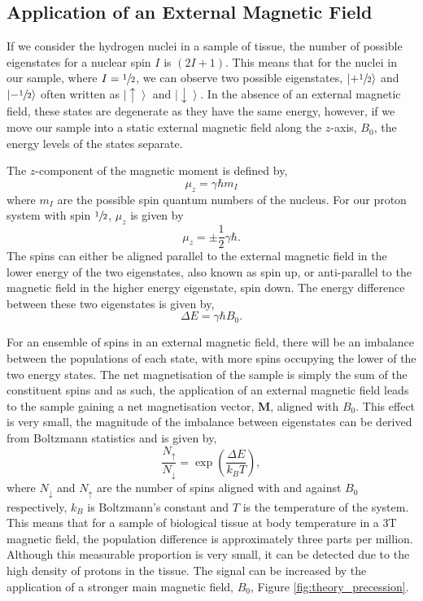 \subsection{Application of an External Magnetic Field}
If we consider the hydrogen nuclei in a sample of tissue, the number of possible eigenstates for a nuclear spin $I$ is $\left(2I + 1\right)$. This means that for the  nuclei in our sample, where $I=\sfrac{1}{2}$, we can observe two possible eigenstates, $\left| + \sfrac{1}{2} \right \rangle$ and $\left| - \sfrac{1}{2} \right \rangle$ often written as $\left|  \uparrow \right \rangle$ and $\left|  \downarrow \right \rangle$. In the absence of an external magnetic field, these states are degenerate as they have the same energy, however, if we move our sample into a static external magnetic field along the $z$-axis, $B_0$, the energy levels of the states separate.

The $z$-component of the magnetic moment is defined by,
\begin{equation}
\mu_z=\gamma \hbar m_I
\label{eq:theory_longitudinal_magnetic_moment}
\end{equation}
where $m_I$ are the possible spin quantum numbers of the nucleus. For our proton system with spin $\sfrac{1}{2}$, $\mu_z$ is given by
\begin{equation}
\mu_z = \pm \frac{1}{2}\gamma\hbar.
\end{equation}
The spins can either be aligned parallel to the external magnetic field in the lower energy of the two eigenstates, also known as spin up, or anti-parallel to the magnetic field in the higher energy eigenstate, spin down. The energy difference between these two eigenstates is given by,
\begin{equation}
\Delta E = \gamma \hbar B_0.
\label{eq:theory_zeeman}
\end{equation}

For an ensemble of spins in an external magnetic field, there will be an imbalance between the populations of each state, with more spins occupying the lower of the two energy states. The net magnetisation of the sample is simply the sum of the constituent spins and as such, the application of an external magnetic field leads to the sample gaining a net magnetisation vector, $\mathbf{M}$, aligned with $B_0$. This effect is very small, the magnitude of the imbalance between eigenstates can be derived from Boltzmann statistics and is given by,
\begin{equation}
\frac{N_{\uparrow}}{N_{\downarrow}} = \exp \left(\frac{\Delta E}{k_B T}\right),
\label{eq:theory_boltzman}
\end{equation}
where $N_{\downarrow}$ and $N_{\uparrow}$ are the number of spins aligned with and against $B_0$ respectively, $k_B$ is Boltzmann's constant and $T$ is the temperature of the system. This means that for a sample of biological tissue at body temperature in a 3T magnetic field, the population difference is approximately three parts per million. Although this measurable proportion is very small, it can be detected due to the high density of protons in the tissue. The signal can be increased by the application of a stronger main magnetic field, $B_0$, Figure \ref{fig:theory_precession}.

